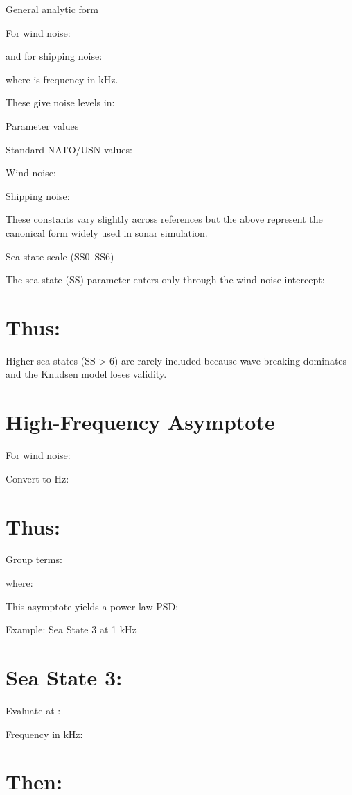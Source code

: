 \documentclass[12pt]{article}
\begin{document}
General analytic form

For wind noise:


and for shipping noise:


where  is frequency in kHz.

These give noise levels in:


Parameter values

Standard NATO/USN values:

Wind noise:



Shipping noise:



These constants vary slightly across references but the above represent the canonical form widely used in sonar simulation.

Sea-state scale (SS0–SS6)

The sea state (SS) parameter enters only through the wind-noise intercept:


\section*{Thus:}

Higher sea states (SS > 6) are rarely included because wave breaking dominates and the Knudsen model loses validity.

\section*{High-Frequency Asymptote}
For wind noise:


Convert  to Hz:


\section*{Thus:}

Group terms:


where:


This asymptote yields a power-law PSD:


Example: Sea State 3 at 1 kHz

\section*{Sea State 3:}

Evaluate at :

Frequency in kHz:


\section*{Then:}
\end{document}
